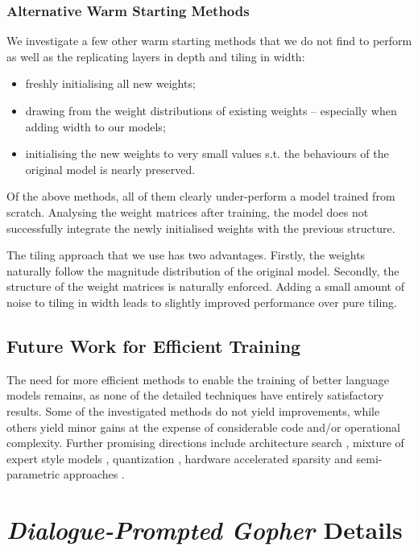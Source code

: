 \documentclass[11pt, a4paper, logo, internal, copyright, nonumbering]{deepmind}
\newcommand{\gopherchat}{\textit{Dialogue-Prompted Gopher}\xspace}
\begin{document}
\subsubsection{Alternative Warm Starting Methods}

We investigate a few other warm starting methods that we do not find to perform as well as the replicating layers in depth and tiling in width:
\begin{itemize}
    \item freshly initialising all new weights;
    \item drawing from the weight distributions of existing weights -- especially when adding width to our models;
    \item initialising the new weights to very small values s.t. the behaviours of the original model is nearly preserved.
\end{itemize}
Of the above methods, all of them clearly under-perform a model trained from scratch. 
Analysing the weight matrices after training, the model does not successfully integrate the newly initialised weights with the previous structure.

The tiling approach that we use has two advantages. Firstly, the weights naturally follow the magnitude distribution of the original model.
Secondly, the structure of the weight matrices is naturally enforced.
Adding a small amount of noise to tiling in width leads to slightly improved performance over pure tiling.

\subsection{Future Work for Efficient Training}

The need for more efficient methods to enable the training of better language models remains, as none of the detailed techniques have entirely satisfactory results. Some of the investigated methods do not yield improvements, while others yield minor gains at the expense of considerable code and/or operational complexity.
Further promising directions include architecture search \citep{so2021primer, pmlr-v97-so19a}, mixture of expert style models \citep{fedus2021switch, roller2021hash, lewis2021base, kim2021scalable}, quantization \citep{q8bert}, hardware accelerated sparsity \citep{mishra2021accelerating} and semi-parametric approaches \citep{guu2020realm, Khandelwal2020Generalization, perez2019finding, borgeaud2021retrieval}. 

\section{\gopherchat Details}
\label{appendix:gopherchat}
\end{document}
